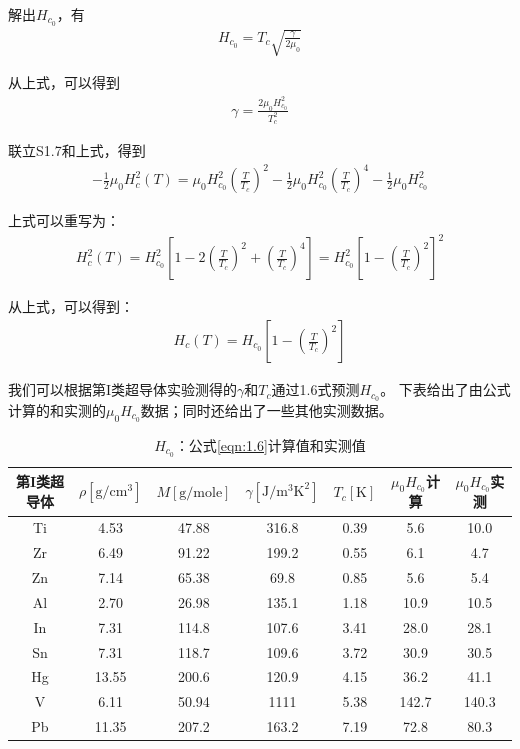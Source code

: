 解出$H_{c_0}$，有
\begin{align*}
H_{c_0}=T_c\sqrt{\frac{\gamma}{2\mu_0}}\tag{1.6}
\end{align*}

从上式，可以得到
\begin{align*}
\gamma=\frac{2\mu_0 H_{c_0}^2}{T_c^2}\tag{S1.9}
\end{align*}

联立S1.7和上式，得到
\begin{align*}
-\frac{1}{2}\mu_0 H_c^2(T)=\mu_0 H_{c_0}^2 \left(\frac{T}{T_c}\right)^2-\frac{1}{2}\mu_0 H_{c_0}^2 \left(\frac{T}{T_c}\right)^4-\frac{1}{2}\mu_0 H_{c_0}^2\tag{S1.10}
\end{align*}

上式可以重写为：
\begin{align*}
H_c^2(T)=H_{c_0}^2\left[1-2\left(\frac{T}{T_c}\right)^2+\left(\frac{T}{T_c}\right)^4\right]=H_{c_0}^2\left[1-\left(\frac{T}{T_c}\right)^2\right]^2\tag{S1.11}
\end{align*}

从上式，可以得到：
\begin{align*}
H_c(T)=H_{c_0}\left[1-\left(\frac{T}{T_c}\right)^2 \right]\tag{1.7}
\end{align*}

我们可以根据第I类超导体实验测得的$\gamma$和$T_c$通过1.6式预测$H_{c_0}$。
下表给出了由公式计算的和实测的$\mu_0 H_{c_0}$数据；同时还给出了一些其他实测数据。
\begin{table}[htbp]\small
  \centering
  \caption{$H_{c_0}$：公式\ref{eqn:1.6}计算值和实测值} \label{tb:eqn1.6andexp}
\begin{tabular}{|c||c|c|c|c|c|c|}
  \hline
第I类超导体&$\rho [\mathrm{g/cm^3}]$&$M [\mathrm{g/mole}]$&$\gamma [\mathrm{J/m^3K^2}]$&$T_c [\mathrm{K}]$&$\mu_0 H_{c_0}$计算&$\mu_0 H_{c_0}$实测 \\ \hline \hline
Ti&4.53&47.88&316.8&0.39&5.6&10.0 \\ \hline
Zr&6.49&91.22&199.2&0.55&6.1&4.7\\ \hline
Zn&7.14&65.38&69.8&0.85&5.6&5.4\\ \hline
Al&2.70&26.98&135.1&1.18&10.9&10.5\\ \hline
In&7.31&114.8&107.6&3.41&28.0&28.1\\  \hline
Sn&7.31&118.7&109.6&3.72&30.9&30.5\\  \hline
Hg&13.55&200.6&120.9&4.15&36.2&41.1\\  \hline
V&6.11&50.94&1111&5.38&142.7&140.3\\  \hline
Pb&11.35&207.2&163.2&7.19&72.8&80.3 \\  \hline
\end{tabular}
\end{table}

